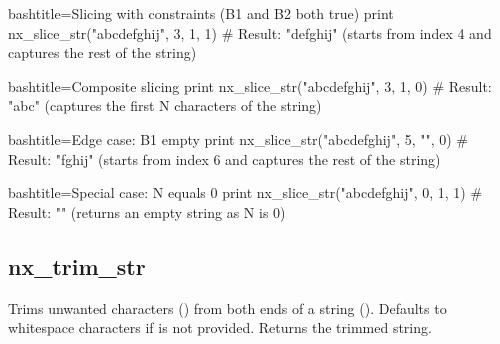 \begin{NexCodeBox}{bash}{title={Slicing with constraints (B1 and B2 both true)}}
	print nx_slice_str("abcdefghij", 3, 1, 1)
	# Result: "defghij" (starts from index 4 and captures the rest of the string)
\end{NexCodeBox}

\begin{NexCodeBox}{bash}{title={Composite slicing}}
	print nx_slice_str("abcdefghij", 3, 1, 0)
	# Result: "abc" (captures the first N characters of the string)
\end{NexCodeBox}

\begin{NexCodeBox}{bash}{title={Edge case: B1 empty}}
	print nx_slice_str("abcdefghij", 5, "", 0)
	# Result: "fghij" (starts from index 6 and captures the rest of the string)
\end{NexCodeBox}

\begin{NexCodeBox}{bash}{title={Special case: N equals 0}}
	print nx_slice_str("abcdefghij", 0, 1, 1)
	# Result: "" (returns an empty string as N is 0)
\end{NexCodeBox}


\newpage
\subsection{nx_trim_str}
\label{nx_trim_str}


\begin{NexMainBox}
	\begin{NexMainBox}
		Trims unwanted characters () from both ends of a string (). Defaults to whitespace characters if  is not provided. Returns the trimmed string.
	\end{NexMainBox}
	\begin{NexMainBox}
		\begin{NexListDark}
		\end{NexListDark}
	\end{NexMainBox}
\end{NexMainBox}

